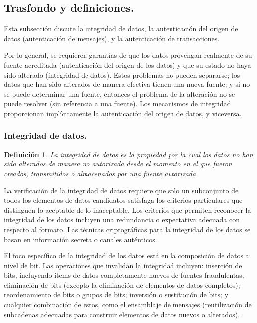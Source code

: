 \documentclass[a4paper, 12pt]{article} %
\newtheorem*{mydef1}{Definición} %
\begin{document}
\subsection{Trasfondo y definiciones.}
Esta subsección discute la integridad de datos, la autenticación del origen de datos (autenticación de mensajes),
y la autenticación de transacciones.

Por lo general, se requieren garantías de que los datos provengan realmente de su fuente acreditada (autenticación
del origen de los datos) y que su estado no haya sido alterado (integridad de datos).
Estos problemas no pueden separarse; los datos que han sido alterados de manera efectiva tienen una nueva fuente;
y si no se puede determinar una fuente, entonces el problema de la alteración no se puede resolver (sin referencia
a una fuente). Los mecanismos de integridad proporcionan implícitamente la autenticación del origen de datos, y
viceversa.

\subsubsection{Integridad de datos.}

\begin{mydef1}
La integridad de datos es la propiedad por la cual los datos no han sido alterados de manera no autorizada desde
el momento en el que fueron creados, transmitidos o almacenados por una fuente autorizada.
\end{mydef1}

La verificación de la integridad de datos requiere que solo un subconjunto de todos los elementos de datos
candidatos satisfaga los criterios particulares que distinguen lo aceptable de lo inaceptable. Los criterios
que permiten reconocer la integridad de los datos incluyen una redundancia o expectativa adecuada con
respecto al formato. Las técnicas criptográficas para la integridad de los datos se basan en información
secreta o canales auténticos.

El foco específico de la integridad de los datos está en la composición de datos a nivel de bit. Las operaciones
que invalidan la integridad incluyen: inserción de bits, incluyendo ítems de datos completamente nuevos de
fuentes fraudulentas; eliminación de bits (excepto la eliminación de elementos de datos completos); reordenamiento
de bits o grupos de bits; inversión o sustitución de bits; y cualquier combinación de estos, como el ensamblaje
de mensajes (reutilización de subcadenas adecuadas para construir elementos de datos nuevos o alterados).
\end{document}
